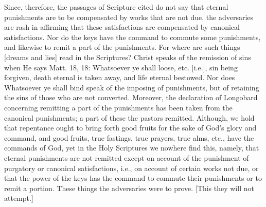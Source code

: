 Since, therefore, the passages of Scripture cited do not say that
eternal punishments are to be compensated by works that are not due,
the adversaries are rash in affirming that these satisfactions are
compensated by canonical satisfactions.  Nor do the keys have the
command to commute some punishments, and likewise to remit a part of
the punishments.  For where are such things [dreams and lies] read in
the Scriptures?  Christ speaks of the remission of sins when He says
Matt. 18, 18: Whatsoever ye shall loose, etc. [i.e.], sin being
forgiven, death eternal is taken away, and life eternal bestowed.
Nor does Whatsoever ye shall bind speak of the imposing of
punishments, but of retaining the sins of those who are not converted.
Moreover, the declaration of Longobard concerning remitting a part
of the punishments has been taken from the canonical punishments; a
part of these the pastors remitted.  Although, we hold that
repentance ought to bring forth good fruits for the sake of God's
glory and command, and good fruits, true fastings, true prayers, true
alms, etc., have the commands of God, yet in the Holy Scriptures we
nowhere find this, namely, that eternal punishments are not remitted
except on account of the punishment of purgatory or canonical
satisfactions, i.e., on account of certain works not due, or that the
power of the keys has the command to commute their punishments or to
remit a portion.  These things the adversaries were to prove.  [This
they will not attempt.]

